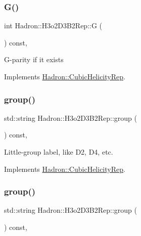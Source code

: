 \subsubsection{\texorpdfstring{G()}{G()}\hspace{0.1cm}{\footnotesize\ttfamily [3/3]}}
{\footnotesize\ttfamily int Hadron\+::\+H3o2\+D3\+B2\+Rep\+::G (\begin{DoxyParamCaption}{ }\end{DoxyParamCaption}) const\hspace{0.3cm}{\ttfamily [inline]}, {\ttfamily [virtual]}}

G-\/parity if it exists 

Implements \mbox{\hyperlink{structHadron_1_1CubicHelicityRep_a50689f42be1e6170aa8cf6ad0597018b}{Hadron\+::\+Cubic\+Helicity\+Rep}}.

\mbox{\label{structHadron_1_1H3o2D3B2Rep_a5f90a196c20d41622da336eefc77cfd1}} 
\subsubsection{\texorpdfstring{group()}{group()}\hspace{0.1cm}{\footnotesize\ttfamily [1/5]}}
{\footnotesize\ttfamily std\+::string Hadron\+::\+H3o2\+D3\+B2\+Rep\+::group (\begin{DoxyParamCaption}{ }\end{DoxyParamCaption}) const\hspace{0.3cm}{\ttfamily [inline]}, {\ttfamily [virtual]}}

Little-\/group label, like D2, D4, etc. 

Implements \mbox{\hyperlink{structHadron_1_1CubicHelicityRep_a101a7d76cd8ccdad0f272db44b766113}{Hadron\+::\+Cubic\+Helicity\+Rep}}.

\mbox{\label{structHadron_1_1H3o2D3B2Rep_a5f90a196c20d41622da336eefc77cfd1}} 
\subsubsection{\texorpdfstring{group()}{group()}\hspace{0.1cm}{\footnotesize\ttfamily [2/5]}}
{\footnotesize\ttfamily std\+::string Hadron\+::\+H3o2\+D3\+B2\+Rep\+::group (\begin{DoxyParamCaption}{ }\end{DoxyParamCaption}) const\hspace{0.3cm}{\ttfamily [inline]}, {\ttfamily [virtual]}}


